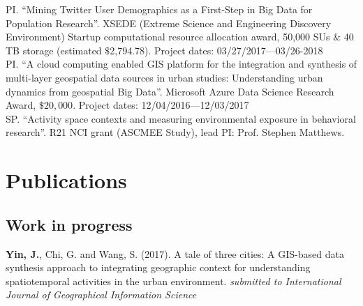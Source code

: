\documentclass[11pt, a4paper]{article}
\newcommand{\years}[1]{\marginnote{\scriptsize #1}}
\begin{document}
PI. ``Mining Twitter User Demographics as a First-Step in Big Data for Population Research''. XSEDE (Extreme Science and Engineering Discovery Environment) Startup computational resource allocation award, 50,000 SUs $\&$ 40 TB storage (estimated $\$$2,794.78). Project dates: 03/27/2017—03/26-2018\\

PI. ``A cloud computing enabled GIS platform for the integration and synthesis of multi-layer geospatial data sources in urban studies: Understanding urban dynamics from geospatial Big Data''. Microsoft Azure Data Science Research Award, $\$20,000$. Project dates: 12/04/2016—12/03/2017\\

SP. ``Activity space contexts and measuring environmental exposure in behavioral research''. R21 NCI grant (ASCMEE Study), lead PI: Prof. Stephen Matthews.

\section*{Publications}
\subsection*{Work in progress}
\years{2017}\textbf{Yin, J.}, Chi, G. and Wang, S. (2017). A tale of three cities: A GIS-based data synthesis approach to integrating geographic context for understanding spatiotemporal activities in the urban environment. \textit{submitted to International Journal of Geographical Information Science}\\
\end{document}
